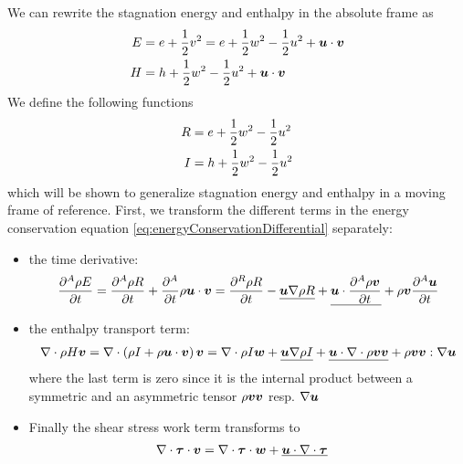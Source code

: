 We can rewrite the stagnation energy and enthalpy in the absolute
frame as
\begin{align*}
  E &= e + \frac{1}{2} v^2 = 
  e + \frac{1}{2} w^2 - \frac{1}{2} u^2 + \boldsymbol {u} \cdot \boldsymbol {v} \\
  H &= h + \frac{1}{2} w^2 - \frac{1}{2} u^2 + \boldsymbol {u} \cdot \boldsymbol {v} 
\end{align*}
We define the following functions
\begin{equation}
  \begin{split}
    R &= e + \frac{1}{2} w^2 - \frac{1}{2}u^2  \\
    I &= h + \frac{1}{2} w^2 - \frac{1}{2}u^2  
  \end{split}
\end{equation}
which will be shown to generalize stagnation energy and enthalpy in a
moving frame of reference. First, we transform the different terms in
the energy conservation equation
\ref{eq:energyConservationDifferential} separately:
\begin{itemize}
\item the time derivative:
  \begin{align*}
    \frac{\partial^A \rho E}{\partial t} = 
    \frac{\partial^A \rho R}{\partial t} + 
    \frac{\partial^A }{\partial t} \rho \boldsymbol {u} \cdot \boldsymbol {v}  =
    \frac{\partial^R \rho R}{\partial t} - 
    \underline{\boldsymbol {u} \nabla \rho R} + 
    \underline{\boldsymbol {u} \cdot \frac{\partial^A \rho \boldsymbol {v}}{\partial t}} + 
    \rho \boldsymbol {v} \frac{\partial^A \boldsymbol {u}}{\partial t} 
  \end{align*}
\item the enthalpy transport term:
  \begin{align*}
    \nabla \cdot \rho H \boldsymbol {v} 
    = 
    \nabla \cdot \left(\rho I + \rho\boldsymbol {u} \cdot \boldsymbol {v}\right) \boldsymbol {v} 
    = 
    \nabla \cdot \rho I \boldsymbol {w} +
    \underline{\boldsymbol {u} \nabla \rho I} + 
    \underline{\boldsymbol {u} \cdot \nabla \cdot \rho \boldsymbol {v} \boldsymbol {v}} + 
    \rho \boldsymbol {v} \boldsymbol {v} : \nabla \boldsymbol {u}
  \end{align*}
  where the last term is zero since it is the internal product between
  a symmetric and an asymmetric tensor $\rho \boldsymbol {v} \boldsymbol {v}$
  resp. $\nabla \boldsymbol {u}$
\item Finally the shear stress work term transforms to 
  \begin{align*}
    \nabla \cdot \boldsymbol {\tau} \cdot \boldsymbol {v} &= 
    \nabla \cdot \boldsymbol {\tau} \cdot \boldsymbol {w}
    + \underline{\boldsymbol {u} \cdot \nabla \cdot \boldsymbol {\tau}}
  \end{align*}
\end{itemize}
